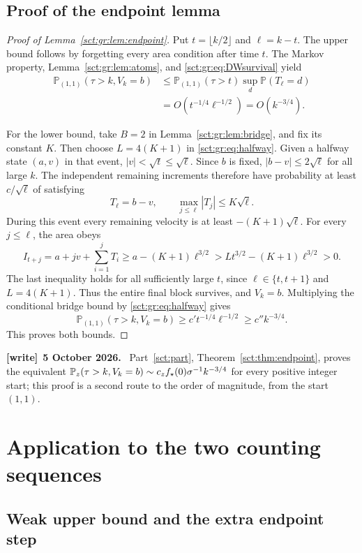 \documentclass[11pt,letterpaper]{article}
\theoremstyle{definition}\newtheorem{remark}[theorem]{Remark}
\newcommand{\Pp}{\mathbb P}\newcommand{\Ee}{\mathbb E}
\newenvironment{writenote}[1][]{\par\smallskip\begingroup\small
 \noindent\textbf{[write]}\if\relax\detokenize{#1}\relax\else~\textbf{#1.}\fi\ }%
 {\par\endgroup\smallskip}
\begin{document}
\subsection{Proof of the endpoint lemma}

\begin{proof}[Proof of Lemma~\ref{sct:gr:lem:endpoint}]
Put $t=\lfloor k/2\rfloor$ and $\ell=k-t$. The upper bound follows by
forgetting every area condition after time $t$. The Markov property,
Lemma~\ref{sct:gr:lem:atoms}, and \eqref{sct:gr:eq:DWsurvival} yield
\begin{align*}
 \Pp_{(1,1)}(\tau>k,V_k=b)
 &\le \Pp_{(1,1)}(\tau>t)\sup_d\Pp(T_\ell=d)\\
 &=O(t^{-1/4}\ell^{-1/2})=O(k^{-3/4}).
\end{align*}

For the lower bound, take $B=2$ in Lemma~\ref{sct:gr:lem:bridge}, and fix its
constant $K$. Then choose $L=4(K+1)$ in \eqref{sct:gr:eq:halfway}. Given a halfway
state $(a,v)$ in that event, $|v|<\sqrt t\le\sqrt\ell$. Since $b$ is fixed,
$|b-v|\le2\sqrt\ell$ for all large $k$. The independent remaining increments
therefore have probability at least $c/\sqrt\ell$ of satisfying
\[
 T_\ell=b-v,\qquad \max_{j\le\ell}|T_j|\le K\sqrt\ell.
\]
During this event every remaining velocity is at least
$-(K+1)\sqrt\ell$. For every $j\le\ell$, the area obeys
\[
 I_{t+j}=a+jv+\sum_{i=1}^jT_i
 \ge a-(K+1)\ell^{3/2}
 >Lt^{3/2}-(K+1)\ell^{3/2}>0.
\]
The last inequality holds for all sufficiently large $t$, since
$\ell\in\{t,t+1\}$ and $L=4(K+1)$. Thus the entire final block survives,
and $V_k=b$. Multiplying the conditional bridge bound by
\eqref{sct:gr:eq:halfway} gives
\[
 \Pp_{(1,1)}(\tau>k,V_k=b)
 \ge c' t^{-1/4}\ell^{-1/2}\ge c''k^{-3/4}.
\]
This proves both bounds.
\end{proof}
\begin{writenote}[5 October 2026]
Part~\ref{sct:part}, Theorem~\ref{sct:thm:endpoint}, proves the equivalent $\Pp_z(\tau>k,V_k=b)\sim c_z\fstar(0)\sigma^{-1}k^{-3/4}$ for every positive integer start; this proof is a second route to the order of magnitude, from the start $(1,1)$.
\end{writenote}

\section{Application to the two counting sequences}\label{sct:gr:sec:application}

\subsection{Weak upper bound and the extra endpoint step}
\end{document}
